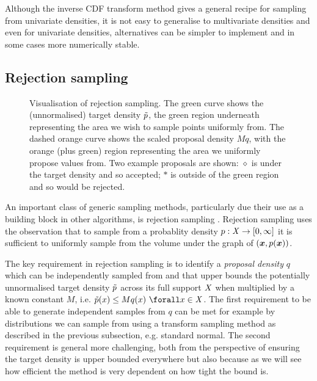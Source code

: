 
Although the inverse \ac{CDF} transform method gives a general recipe for sampling from univariate densities, it is not easy to generalise to multivariate densities and even for univariate densities, alternatives can be simpler to implement and in some cases more numerically stable.

\subsection{Rejection sampling}

\begin{figure}[t]
\centering
{}
\caption[Visualisation of rejection sampling.]{Visualisation of rejection sampling. The green curve shows the (unnormalised) target density $\tilde{p}$, the green region underneath representing the area we wish to sample points uniformly from. The dashed orange curve shows the scaled proposal density $M q$, with the orange (plus green) region representing the area we uniformly propose values from. Two example proposals are shown: $\diamond$ is under the target density and so accepted; $*$ is outside of the green region and so would be rejected.}
\label{fig:rejection-sampling}
\end{figure}

An important class of generic sampling methods, particularly due their use as a building block in other algorithms, is rejection sampling \citep{vonneumann1951various}. Rejection sampling uses the observation that to sample from a probablity density $p : \mathit{X} \to [0, \infty]$ it is sufficient to uniformly sample from the volume under the graph of $\lpa\vct{x}, \tgtdens(\vct{x})\rpa$.

The key requirement in rejection sampling is to identify a \emph{proposal density} $q$ which can be independently sampled from and that upper bounds the potentially unnormalised target density $\tilde{p}$ across its full support $\mathit{X}$ when multiplied by a known constant $M$, i.e. $\utgtdens(x) \leq M q(x) ~\forall x \in \set{X}$. The first requirement to be able to generate independent samples from $q$ can be met for example by distributions we can sample from using a transform sampling method as described in the previous subsection, e.g. standard normal. The second requirement is general more challenging, both from the perspective of ensuring the target density is upper bounded everywhere but also because as we will see how efficient the method is very dependent on how tight the bound is.

